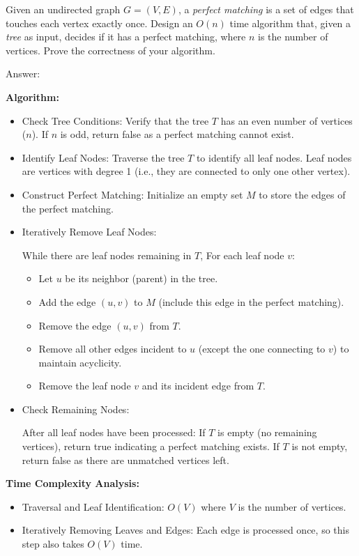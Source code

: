 \documentclass{oxmathproblems}
\begin{document}
\begin{questions}
\miquestion[25]
Given an undirected graph $G=(V,E)$, a \emph{perfect matching} is a set of edges that touches each vertex exactly once.
Design an $O(n)$ time algorithm that, given a \emph{tree} as input, decides if it has a perfect matching, where $n$ is the number of vertices.
Prove the correctness of your algorithm.

Answer:

\textbf{Algorithm:}
\begin{itemize}
    \item Check Tree Conditions:
    Verify that the tree $T$ has an even number of vertices ($n$). If $n$ is odd, return false as a perfect matching cannot exist.
    \item Identify Leaf Nodes:
   Traverse the tree $T$ to identify all leaf nodes. Leaf nodes are vertices with degree 1 (i.e., they are connected to only one other vertex).
    \item Construct Perfect Matching:
   Initialize an empty set $M$ to store the edges of the perfect matching.
    \item Iteratively Remove Leaf Nodes:
    
        While there are leaf nodes remaining in $T$,
        For each leaf node $v$:
    \begin{itemize}
        
        \item Let $u$ be its neighbor (parent) in the tree.
        \item Add the edge $(u, v)$ to $M$ (include this edge in the perfect matching).
        \item Remove the edge $(u, v)$ from $T$.
        \item Remove all other edges incident to $u$ (except the one connecting to $v$) to maintain acyclicity.
        \item Remove the leaf node $v$ and its incident edge from $T$.
    \end{itemize} 
    \item Check Remaining Nodes:
    
     After all leaf nodes have been processed:
         If $T$ is empty (no remaining vertices), return true indicating a perfect matching exists.
         If $T$ is not empty, return false as there are unmatched vertices left.
\end{itemize}

\textbf{Time Complexity Analysis:}
\begin{itemize}
    \item Traversal and Leaf Identification: $O(V)$ where $V$ is the number of vertices.
    \item Iteratively Removing Leaves and Edges: Each edge is processed once, so this step also takes $O(V)$ time.
\end{itemize}


\end{questions}
\end{document}
